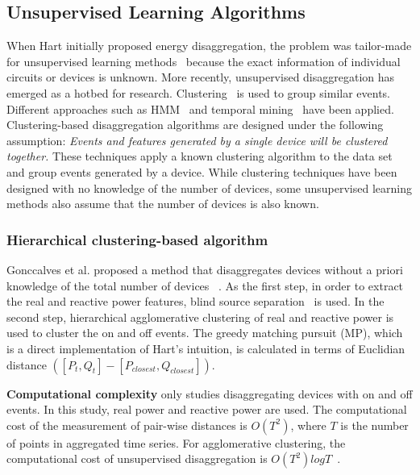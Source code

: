 \subsection{Unsupervised Learning Algorithms}
\label{sec:unsupervised}
When Hart initially proposed energy disaggregation,
the problem was tailor-made for unsupervised learning methods~\cite{hart1992} because
the exact information of individual circuits or devices
is unknown.
More recently, unsupervised disaggregation has emerged as a hotbed for research. 
Clustering~\cite{gonccalves2011unsupervised} is used to group similar events. Different approaches such as 
HMM~\cite{kim2011unsupervised,kolter2012aistat,parson2012nonintrusive} and temporal mining~\cite{shao2012temporal} have been applied. 
Clustering-based disaggregation algorithms are designed under the following assumption:
{\em Events and features generated by a single device will be clustered together.}
These techniques apply a known clustering algorithm to the data set and group events generated by a device.
While clustering techniques have been designed with no knowledge of the number of devices, some unsupervised learning methods also assume that the number of devices is also known.
 
\subsubsection{Hierarchical clustering-based algorithm}
Gonccalves et al. proposed a method that disaggregates devices without a priori knowledge of the total number of devices ~\cite{gonccalves2011unsupervised}. 
As the first step, in order to extract the real and reactive power features, blind source separation~\cite{lee1999blindsource} is used. 
In the second step, hierarchical agglomerative clustering of real and reactive power is used to cluster the on and off events.
The greedy matching pursuit (MP), which is a direct implementation of Hart's intuition,
is calculated in terms of Euclidian distance
$([P_t,Q_t]-[P_{closest},Q_{closest}])$.

\textbf{Computational complexity}
\cite{gonccalves2011unsupervised} only studies disaggregating devices with 
on and off events. 
In this study, real power and reactive power are used. 
The computational cost of the measurement of pair-wise distances 
is $O(T^2)$, where $T$ is the number of points in aggregated time series. 
For agglomerative clustering, 
the computational cost of unsupervised 
disaggregation is $O(T^2)logT$~\cite{jain1999data}. 

